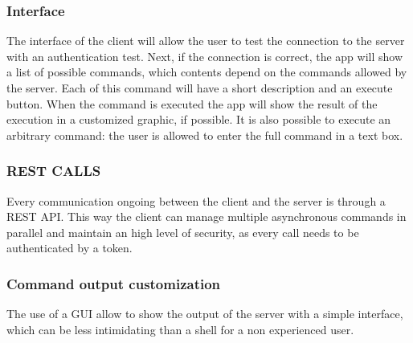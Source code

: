 \documentclass[../PiTest.tex]{subfiles}
\begin{document}
    \subsubsection{Interface}
    The interface of the client will allow the user to test the connection to the server with an authentication test. Next, if the connection is correct, the app will show a list of possible commands, which contents depend on the commands allowed by the server. Each of this command will have a short description and an execute button.
    When the command is executed the app will show the result of the execution in a customized graphic, if possible.
    It is also possible to execute an arbitrary command: the user is allowed to enter the full command in a text box.

    \subsubsection{REST CALLS}
    Every communication ongoing between the client and the server is through a REST API. This way the client can manage multiple asynchronous commands in parallel and maintain an high level of security, as every call needs to be authenticated by a token.

    \subsubsection{Command output customization}
    The use of a GUI allow to show the output of the server with a simple interface, which can be less intimidating than a shell for a non experienced user.
\end{document}
